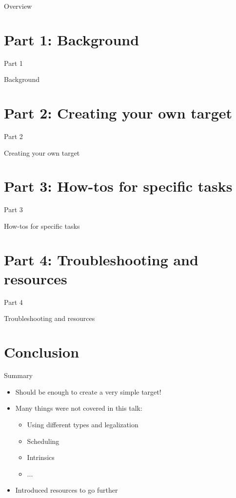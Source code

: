 \documentclass[t]{beamer}
\newcommand{\talkpart}[3]{%
\section{Part #1: #2}

\begin{frame}[c]{Part #1}

\vspace{1cm}
\centerline{\LARGE{#2}}

\end{frame}
}
\begin{document}

\begin{frame}{Overview}

\tableofcontents[subsectionstyle=hide]

\end{frame}


\talkpart{1}{Background}{SlidesBeamer-part1.tex}

\talkpart{2}{Creating your own target}{SlidesBeamer-part2.tex}

\talkpart{3}{How-tos for specific tasks}{SlidesBeamer-part3.tex}

\talkpart{4}{Troubleshooting and resources}{SlidesBeamer-part4.tex}


\section{Conclusion}

\begin{frame}{Summary}

\begin{itemize}
    \item Should be enough to create a very simple target!
    \item Many things were not covered in this talk:
    \begin{itemize}
        \item Using different types and legalization
        \item Scheduling
        \item Intrinsics
        \item ...
    \end{itemize}
    \item Introduced resources to go further
\end{itemize}

\end{frame}

\end{document}
